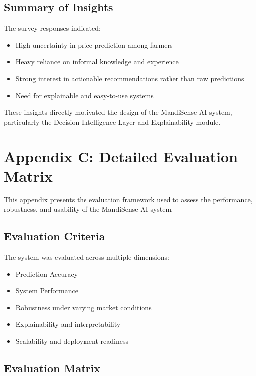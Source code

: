 \documentclass[12pt,a4paper]{report}
\begin{document}
\section{Summary of Insights}

The survey responses indicated:
\begin{itemize}
    \item High uncertainty in price prediction among farmers
    \item Heavy reliance on informal knowledge and experience
    \item Strong interest in actionable recommendations rather than raw predictions
    \item Need for explainable and easy-to-use systems
\end{itemize}

These insights directly motivated the design of the MandiSense AI system, particularly the Decision Intelligence Layer and Explainability module.

\chapter{Appendix C: Detailed Evaluation Matrix}

This appendix presents the evaluation framework used to assess the performance, robustness, and usability of the MandiSense AI system.

\section{Evaluation Criteria}

The system was evaluated across multiple dimensions:

\begin{itemize}
    \item Prediction Accuracy
    \item System Performance
    \item Robustness under varying market conditions
    \item Explainability and interpretability
    \item Scalability and deployment readiness
\end{itemize}

\section{Evaluation Matrix}
\end{document}
